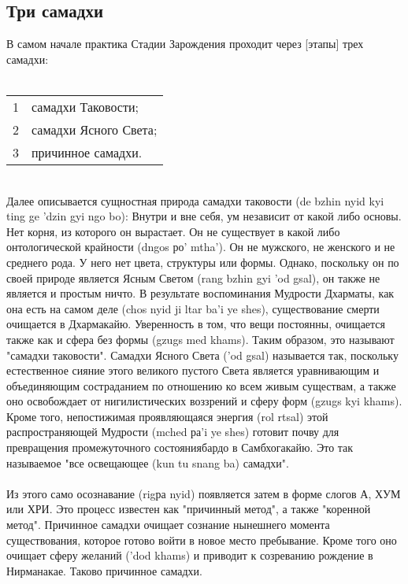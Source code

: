 \subsection{Три самадхи}
\vspace{0.2cm}
В самом начале практика Стадии Зарождения проходит через [этапы] трех самадхи:\\
\\
\vspace{0.2cm}
\begin{tabular}{ll}
1 & самадхи Таковости;\\
2 & самадхи Ясного Света;\\
3 & причинное самадхи.\\
\end{tabular}
\\
Далее описывается сущностная природа самадхи таковости (de bzhin nyid kyi ting ge 'dzin
gyi ngo bo): Внутри и вне себя, ум независит от какой либо основы. Нет корня, из которого
он вырастает. Он не существует в какой либо онтологической крайности (dngos ро' mtha'). Он
не мужского, не женского и не среднего рода. У него нет цвета, структуры или формы.
Однако, поскольку он по своей природе является Ясным Светом (rang bzhin gyi 'od gsal), он
также не является и простым ничто. В результате воспоминания Мудрости Дхарматы, как
она есть на самом деле (chos nyid ji ltar ba'i ye shes), существование смерти очищается в
Дхармакайю. Уверенность в том, что вещи постоянны, очищается также как и сфера без
формы (gzugs med khams). Таким образом, это называют "самадхи таковости".
Самадхи Ясного Света ('od gsal) называется так, поскольку естественное сияние этого
великого пустого Света является уравнивающим и объединяющим состраданием по
отношению ко всем живым существам, а также оно освобождает от нигилистических
воззрений и сферу форм (gzugs kyi khams). Кроме того, непостижимая проявляющаяся
энергия (rol rtsal) этой распространяющей Мудрости (mched ра'i ye shes) готовит почву для
превращения промежуточного состояния\-бардо в Самбхогакайю. Это так называемое "все
освещающее (kun tu snang ba) самадхи".\\
\\
Из этого само осознавание (rigра nyid) появляется затем в форме слогов А, ХУМ или
ХРИ. Это процесс известен как "причинный метод", а также "коренной метод". Причинное
самадхи очищает сознание нынешнего момента существования, которое готово войти в
новое место пребывание. Кроме того оно очищает сферу желаний ('dod khams) и приводит к
созреванию рождение в Нирманакае. Таково причинное самадхи.

